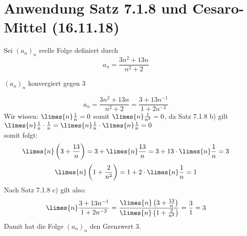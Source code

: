 \documentclass[12pt,a4paper,titlepage,draft]{article}
\begin{document}
	\section{Anwendung Satz 7.1.8 und Cesaro-Mittel (16.11.18)}
	\begin{bsp}
		Sei \((a_n)_n\) reelle Folge definiert durch
		\[a_n = \frac{3n^2+13n}{n^2+2}\]
		\begin{beh}
			\((a_n)_n\) konvergiert gegen \(3\)
		\end{beh}
		\begin{bew}
			\[a_n = \frac{3n^2+13n}{n^2+2} = \frac{3 + 13n^{-1}}{1 + 2n^{-2}}\]
			Wir wissen: \(\limes{n} \frac{1}{n} = 0\) somit \(\limes{n} \frac{1}{n^2} = 0\), da Satz 7.1.8 b) gilt\\
			\(\limes{n} \frac{1}{n} \cdot \frac{1}{n} = \limes{n} \frac{1}{n} \cdot \limes{n} \frac{1}{n} = 0\)\\
			somit folgt:
			\[\limes{n} \left(3+\frac{13}{n}\right) = 3 + \limes{n} \frac{13}{n} = 3 + 13 \cdot \limes{n} \frac{1}{n} = 3\]
			\[\limes{n} \left(1 + \frac{2}{n^2}\right) = 1 + 2 \cdot \limes{n} \frac{1}{n} = 1\]
			Nach Satz 7.1.8 c) gilt also:
			\[\limes{n} \frac{3 + 13n^{-1}}{1 + 2n^{-2}} = \frac{\limes{n} \left(3+\frac{13}{n}\right)}{\limes{n} \left(1 + \frac{2}{n^2}\right)} = \frac{3}{1} = 3\]
			Damit hat die Folge \((a_n)_n\) den Grenzwert 3.
		\end{bew}
	\end{bsp}
\end{document}
